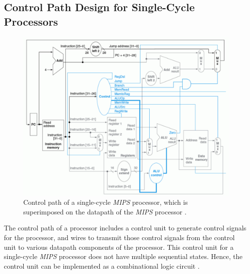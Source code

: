 \subsection{Control Path Design for Single-Cycle Processors}
\label{ssec:ControlPathDesignforSingleCycleProcessors}

\begin{figure}[h]
\centering 
\includegraphics[width=5in]{./pics/single-cycle-processor}
\caption{Control path of a single-cycle {\it MIPS} processor, which is superimposed on the datapath of the {\it MIPS} processor \cite{Patterson2005,Patterson2009}.}
\label{fig:singlecycleprocessor}
\end{figure}

The control path of a processor includes a control unit to generate control signals for the processor, and wires to transmit those control signals from the control unit to various datapath components of the processor. This control unit for a single-cycle {\it MIPS} processor does not have multiple sequential states. Hence, the control unit can be implemented as a combinational logic circuit \cite{Patterson2005a}. \\

